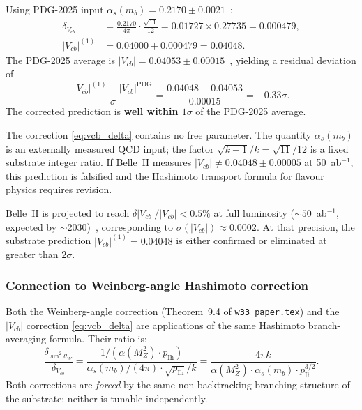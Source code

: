 Using PDG-2025 input $\alpha_s(m_b) = 0.2170 \pm 0.0021$~\cite{PDG2024}:
\begin{align}
  \delta_{V_{cb}} &= \frac{0.2170}{4\pi} \cdot \frac{\sqrt{11}}{12}
  = 0.01727 \times 0.27735 = 0.000479, \\
  |V_{cb}|^{(1)} &= 0.04000 + 0.000479 = 0.04048.
\end{align}
The PDG-2025 average is $|V_{cb}| = 0.04053 \pm 0.00015$~\cite{PDG2024},
yielding a residual deviation of
\begin{equation}
  \frac{|V_{cb}|^{(1)} - |V_{cb}|^{\mathrm{PDG}}}{\sigma}
  = \frac{0.04048 - 0.04053}{0.00015} = -0.33\sigma.
  \label{eq:vcb_residual}
\end{equation}
The corrected prediction is \textbf{well within $1\sigma$} of the PDG-2025 average.

\begin{remark}
  The correction \eqref{eq:vcb_delta} contains no free parameter.
  The quantity $\alpha_s(m_b)$ is an externally measured QCD input;
  the factor $\sqrt{k-1}/k = \sqrt{11}/12$ is a fixed substrate integer ratio.
  If Belle~II measures $|V_{cb}| \neq 0.04048 \pm 0.00005$ at 50~ab$^{-1}$,
  this prediction is falsified and the Hashimoto transport formula
  for flavour physics requires revision.
\end{remark}

\begin{remark}
  Belle~II is projected to reach $\delta|V_{cb}|/|V_{cb}| < 0.5\%$
  at full luminosity ($\sim 50$~ab$^{-1}$, expected by $\sim$2030)~\cite{BelleII_WP},
  corresponding to $\sigma(|V_{cb}|) \approx 0.0002$.  At that precision,
  the substrate prediction $|V_{cb}|^{(1)} = 0.04048$ is either confirmed
  or eliminated at greater than $2\sigma$.
\end{remark}

\subsubsection{Connection to Weinberg-angle Hashimoto correction}

Both the Weinberg-angle correction (Theorem~9.4 of \texttt{w33\_paper.tex})
and the $|V_{cb}|$ correction \eqref{eq:vcb_delta} are applications of the
same Hashimoto branch-averaging formula.  Their ratio is:
\begin{equation}
  \frac{\delta_{\sin^2\theta_W}}{\delta_{V_{cb}}}
  = \frac{1/(\alpha(M_Z^2) \cdot p_{\mathrm{Ih}})}{\alpha_s(m_b)/(4\pi) \cdot \sqrt{p_{\mathrm{Ih}}}/k}
  = \frac{4\pi k}{\alpha(M_Z^2) \cdot \alpha_s(m_b) \cdot p_{\mathrm{Ih}}^{3/2}}.
  \label{eq:weinberg_vcb_ratio}
\end{equation}
Both corrections are \emph{forced} by the same non-backtracking branching structure
of the substrate; neither is tunable independently.
